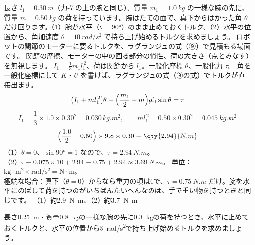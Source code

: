 \label{ph:波-3:ex10}
\begin{phreidai}[ロボットの腕を支えるトルク]
長さ $l_1=\qty{0.30}{m}$（力-7 の上の腕と同じ）、質量 $m_1=\qty{1.0}{kg}$ の一様な腕の先に、質量 $m=\qty{0.50}{kg}$ の荷を持っています。腕はたての面で、真下からはかった角 $\theta$ だけ回ります。（1）腕が水平（$\theta=90°$）のまま止めておくトルク、（2）水平の位置から、角加速度 $\ddot\theta=\qty{10}{rad/s^2}$ で持ち上げ始めるトルクを求めましょう。
\phbamen
ロボットの関節のモーターに要るトルクを、ラグランジュの式（⑨）で見積もる場面です。
\phmushi
関節の摩擦、モーターの中の回る部分の慣性、荷の大きさ（点とみなす）を無視します。
\phzu
$I_1=\tfrac13m_1l_1^{\,2}$、荷は関節から $l_1$。一般化座標 $\theta$、一般化力 $\tau$。
\phriyu
角を一般化座標にして $K$・$U$ を書けば、ラグランジュの式（⑨の式）でトルクが直接出ます。
\phtateru
\[\bigl(I_1+ml_1^{\,2}\bigr)\ddot\theta+\Bigl(\frac{m_1}{2}+m\Bigr)gl_1\sin\theta=\tau\]
\phtoku
\[I_1=\frac13\times1.0\times0.30^2=\qty{0.030}{kg.m^2},\qquad ml_1^{\,2}=0.50\times0.30^2=\qty{0.045}{kg.m^2}\]
\[\Bigl(\frac{1.0}{2}+0.50\Bigr)\times9.8\times0.30=\qty{2.94}{N.m}\]
（1）$\ddot\theta=0$、$\sin90°=1$ なので、$\tau=\qty{2.94}{N.m}$。\\
（2）$\tau=0.075\times10+2.94=0.75+2.94\approx\qty{3.69}{N.m}$。
\phtashikame
単位：$\mathrm{kg{\cdot}m^2}\times\mathrm{rad/s^2}=\mathrm{N{\cdot}m}$。\\
極端な場合：真下（$\theta=0$）からなら重力の項は0で、$\tau=\qty{0.75}{N.m}$ だけ。腕を水平にのばして荷を持つのがいちばんたいへんなのは、手で重い物を持つときと同じです。
\kotae （1）約\qty{2.9}{N.m}、（2）約\qty{3.7}{N.m}
\end{phreidai}
\begin{jibun}
長さ\qty{0.25}{m}・質量\qty{0.8}{kg}の一様な腕の先に\qty{0.3}{kg}の荷を持つとき、水平に止めておくトルクと、水平の位置から\qty{8}{rad/s^2}で持ち上げ始めるトルクを求めましょう。
\end{jibun}

